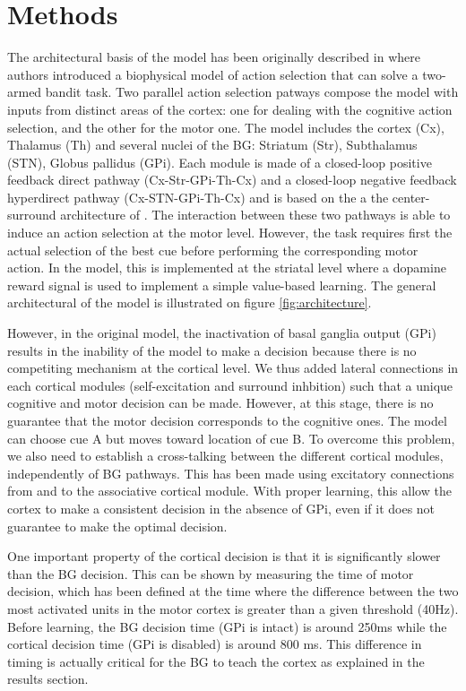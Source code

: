 \section{Methods}

The architectural basis of the model has been originally described in
\citet{Guthrie2013} where authors introduced a biophysical model of action
selection that can solve a two-armed bandit task. Two parallel action selection
patways compose the model with inputs from distinct areas of the cortex: one
for dealing with the cognitive action selection, and the other for the motor
one. The model includes the cortex (Cx), Thalamus (Th) and several nuclei of
the BG: Striatum (Str), Subthalamus (STN), Globus pallidus (GPi). Each module
is made of a closed-loop positive feedback direct pathway (Cx-Str-GPi-Th-Cx)
and a closed-loop negative feedback hyperdirect pathway (Cx-STN-GPi-Th-Cx) and
is based on the a the center-surround architecture of \cite{Mink:1996}. The
interaction between these two pathways is able to induce an action selection at
the motor level. However, the task requires first the actual selection of the
best cue before performing the corresponding motor action. In the
\citet{Guthrie2013} model, this is implemented at the striatal level where a
dopamine reward signal is used to implement a simple value-based learning. The
general architectural of the model is illustrated on figure
\ref{fig:architecture}.

However, in the original model, the inactivation of basal ganglia output (GPi)
results in the inability of the model to make a decision because there is no
competiting mechanism at the cortical level. We thus added lateral connections
in each cortical modules (self-excitation and surround inhbition) such that a
unique cognitive and motor decision can be made. However, at this stage, there
is no guarantee that the motor decision corresponds to the cognitive ones. The
model can choose cue A but moves toward location of cue B. To overcome this
problem, we also need to establish a cross-talking between the different
cortical modules, independently of BG pathways. This has been made using
excitatory connections from and to the associative cortical module. With proper
learning, this allow the cortex to make a consistent decision in the absence of
GPi, even if it does not guarantee to make the optimal decision.

One important property of the cortical decision is that it is significantly
slower than the BG decision. This can be shown by measuring the time of motor
decision, which has been defined at the time where the difference between the
two most activated units in the motor cortex is greater than a given threshold
(40Hz). Before learning, the BG decision time (GPi is intact) is around 250ms
while the cortical decision time (GPi is disabled) is around 800 ms. This
difference in timing is actually critical for the BG to teach the cortex as
explained in the results section.
